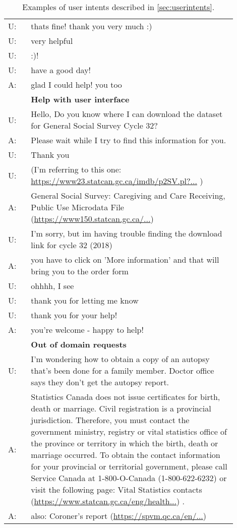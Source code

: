 \documentclass[11pt]{article}
\begin{document}
\begin{table*}[h]
\begin{tabular}{l p{0.90\linewidth}}
U: & thats fine! thank you very much :)\\
U: & very helpful\\
U: & :)!\\
U: & have a good day!\\
A: & glad I could help! you too\\
\midrule
& \textbf{Help with user interface} \\
U: &  Hello, Do you know where I can download the dataset for General Social Survey Cycle 32? \\
A: &  Please wait while I try to find this information for you. \\
U: &  Thank you \\
U: &  (I'm referring to this one: \href{https://www23.statcan.gc.ca/imdb/p2SV.pl?Function=getSurvey&SDDS=4502#a2}{https://www23.statcan.gc.ca/imdb/p2SV.pl?...}
) \\
A: &  General Social Survey: Caregiving and Care Receiving, Public Use Microdata File (\href{https://www150.statcan.gc.ca/n1/en/catalogue/89M0031X}{https://www150.statcan.gc.ca/...}) \\
U: &  I'm sorry, but im having trouble finding the download link for cycle 32 (2018) \\
A: &  you have to click on 'More information' and that will bring you to the order form \\
U: &  ohhhh, I see \\
U: &  thank you for letting me know \\
U: &  thank you for your help! \\
A: &  you're welcome - happy to help! \\
\midrule
& \textbf{Out of domain requests}\\
U: &  I'm wondering how to obtain a copy of an autopsy that's been done for a family member. Doctor office says they don't get the autopsy report. \\
A: &  Statistics Canada does not issue certificates for birth, death or marriage. Civil registration is a provincial jurisdiction. Therefore, you must contact the government ministry, registry or vital statistics office of the province or territory in which the birth, death or marriage occurred. To obtain the contact information for your provincial or territorial government, please call Service Canada at 1-800-O-Canada (1-800-622-6232) or visit the following page:  Vital Statistics contacts (\href{https://www.statcan.gc.ca/eng/health/vital/2012001/con}{https://www.statcan.gc.ca/eng/health...}) . \\
A: &  also: Coroner's report (\href{https://spvm.qc.ca/en/Fiches/Details/Coroners-report}{https://spvm.qc.ca/en/...})\\
\bottomrule
\end{tabular}
    \caption{Examples of user intents described in \autoref{sec:userintents}.}
    \label{tab:examples_user_intents}
\end{table*}
\end{document}

